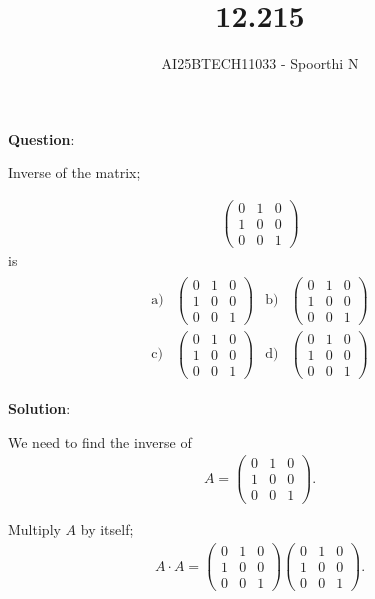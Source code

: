 \documentclass{beamer}
\title{12.215}
\author{AI25BTECH11033 - Spoorthi N}
\theoremstyle{remark}
\numberwithin{equation}{section}
\begin{document}
{\let\newpage\relax\maketitle}
\renewcommand{\thefigure}{\theenumi}
\renewcommand{\thetable}{\theenumi}

\textbf{Question}:

Inverse of the matrix;

\begin{align}
\begin{pmatrix}
0 & 1 & 0 \\
1 & 0 & 0 \\
0 & 0 & 1
\end{pmatrix}
\end{align}
is
\begin{align}
\begin{array}{llll}
\text{a)} &
\begin{pmatrix}
0 & 1 & 0 \\
1 & 0 & 0 \\
0 & 0 & 1
\end{pmatrix}
&
\text{b)} &
\begin{pmatrix}
0 & 1 & 0 \\
1 & 0 & 0 \\
0 & 0 & 1
\end{pmatrix}
\\[2em]
\text{c)} &
\begin{pmatrix}
0 & 1 & 0 \\
1 & 0 & 0 \\
0 & 0 & 1
\end{pmatrix}
&
\text{d)} &
\begin{pmatrix}
0 & 1 & 0 \\
1 & 0 & 0 \\
0 & 0 & 1
\end{pmatrix}
\end{array}
\end{align}


\textbf{Solution}:

We need to find the inverse of
\begin{align}
A =
\begin{pmatrix}
0 & 1 & 0 \\
1 & 0 & 0 \\
0 & 0 & 1
\end{pmatrix}.
\end{align}

Multiply $A$ by itself;
\begin{align}
A \cdot A =
\begin{pmatrix}
0 & 1 & 0 \\
1 & 0 & 0 \\
0 & 0 & 1
\end{pmatrix}
\begin{pmatrix}
0 & 1 & 0 \\
1 & 0 & 0 \\
0 & 0 & 1
\end{pmatrix}.
\end{align}
\end{document}
